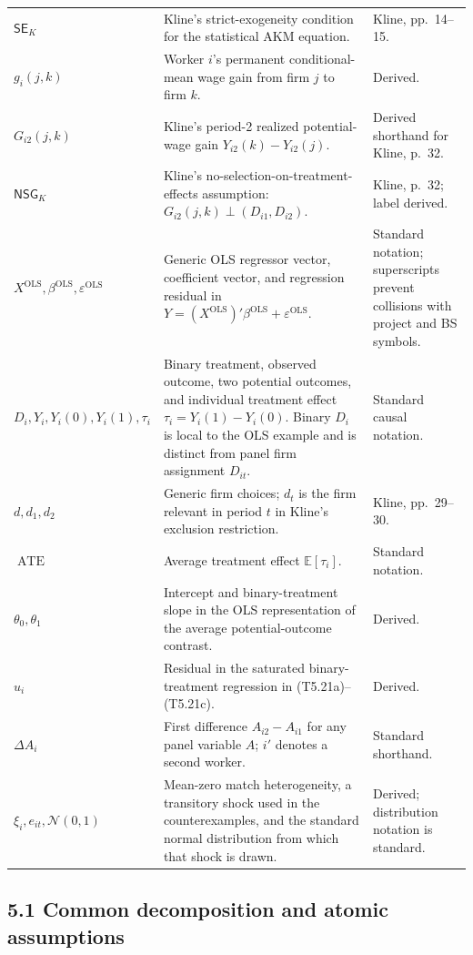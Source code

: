 \documentclass[11pt]{article}
\begin{document}
\begin{longtable}{p{}p{}p{}}
\(\mathsf{SE}_{K}\) & Kline's strict-exogeneity condition for the statistical
AKM equation. & Kline, pp.\ 14--15. \\
\(g_i(j,k)\) & Worker \(i\)'s permanent conditional-mean wage gain from firm
\(j\) to firm \(k\). & Derived. \\
\(G_{i2}(j,k)\) & Kline's period-2 realized potential-wage gain
\(Y_{i2}(k)-Y_{i2}(j)\). & Derived shorthand for Kline, p.\ 32. \\
\(\mathsf{NSG}_{K}\) & Kline's no-selection-on-treatment-effects assumption:
\(G_{i2}(j,k)\perp(D_{i1},D_{i2})\). & Kline, p.\ 32; label derived. \\
\(X^{\mathrm{OLS}},\beta^{\mathrm{OLS}},
\varepsilon^{\mathrm{OLS}}\) & Generic OLS regressor vector, coefficient
vector, and regression residual in
\(Y=(X^{\mathrm{OLS}})'\beta^{\mathrm{OLS}}
+\varepsilon^{\mathrm{OLS}}\). & Standard notation; superscripts prevent
collisions with project and BS symbols. \\
\(D_i,Y_i,Y_i(0),Y_i(1),\tau_i\) & Binary treatment, observed outcome, two
potential outcomes, and individual treatment effect
\(\tau_i=Y_i(1)-Y_i(0)\).  Binary \(D_i\) is
local to the OLS example and is distinct from panel firm assignment
\(D_{it}\). & Standard causal notation. \\
\(d,d_1,d_2\) & Generic firm choices; \(d_t\) is the firm relevant in period
\(t\) in Kline's exclusion restriction. & Kline, pp.\ 29--30. \\
\(\operatorname{ATE}\) & Average treatment effect
\(\mathbb E[\tau_i]\). & Standard notation. \\
\(\theta_0,\theta_1\) & Intercept and binary-treatment slope in the OLS
representation of the average potential-outcome contrast. & Derived. \\
\(u_i\) & Residual in the saturated binary-treatment regression in
(T5.21a)--(T5.21c). & Derived. \\
\(\Delta A_i\) & First difference \(A_{i2}-A_{i1}\) for any panel variable
\(A\); \(i'\) denotes a second worker. & Standard shorthand. \\
\(\xi_i,e_{it},\mathcal N(0,1)\) & Mean-zero match heterogeneity, a
transitory shock used in the counterexamples, and the standard normal
distribution from which that shock is drawn. & Derived; distribution
notation is standard. \\
\end{longtable}
\subsection{5.1 Common decomposition and atomic assumptions}
\end{document}
